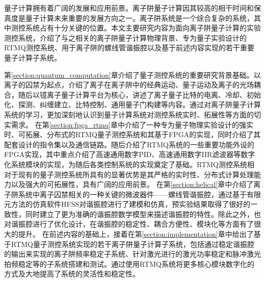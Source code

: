 
\begin{conclusion}

量子计算拥有着广阔的发展和应用前景。离子阱量子计算因其较高的相干时间和保真度是量子计算未来重要的发展方向之一。离子阱系统是一个综合复杂的系统，其中测控系统占有十分关键的位置。本文主要研究内容为面向离子阱量子计算的实验测控系统，介绍了与之相关的离子阱量子计算物理背景、专为量子实验设计的RTMQ测控系统、用于离子阱的螺线管谐振腔以及基于前述内容实现的若干重要量子计算子系统。

第\ref{section:quantum_computation}章介绍了量子测控系统的重要研究背景基础。以离子的囚禁为起点，介绍了离子在离子阱中的经典运动、量子运动及离子的光场耦合，随后以镱离子量子计算平台为核心，讲述了离子量子比特的电离、冷却、初始化、探测、纠缠建立、比特控制、通用量子门构建等内容。通过对离子阱量子计算系统的学习，更加深刻地认识到量子计算系统对测控系统实时、拓展性等方面的切实需求。
在第\ref{section:fpga_rtmq}章中介绍了一种专为量子物理实验设计的强实时、可拓展、分布式的RTMQ量子测控系统和其基于FPGA的实现，同时介绍了其配套设计的指令集以及通信链路。随后介绍了RTMQ系统的一些重要功能外设的FPGA实现，其中重点介绍了高速通用数字PID、高速通用数字IIR滤波器等数字化系统模块的实现，为随后各类控制系统的实现奠定了基础。RTMQ测控系统相对于现有的量子测控系统所具有的显著优势是其严格的实时性、分布式计算处理能力以及强大的可拓展性，具有广阔的应用前景。
在第\ref{section:helical}章中介绍了离子阱系统中离子囚禁相关的一种关键的微波器件——螺线管谐振腔，通过基于有限元方法的仿真软件HFSS对谐振腔进行了建模和仿真，预实验结果取得了很好的一致性，同时建立了更为准确的谐振腔数学模型来描述谐振腔的特性。除此之外，也对谐振腔进行了优化设计，在谐振腔的稳定性、耦合方便性、模块化等方面有了很大的提升。
在前述内容的基础上，接着在第\ref{section:implementation}章中给出了基于RTMQ量子测控系统实现的若干离子阱量子计算子系统，包括通过稳定谐振腔的输出来实现的离子阱频率稳定子系统、针对激光进行的激光功率稳定和脉冲激光拍频稳定等的子系统搭建和测试。通过使用RTMQ系统将更多核心模块数字化的方式及大地提高了系统的灵活性和稳定性。



\end{conclusion}


